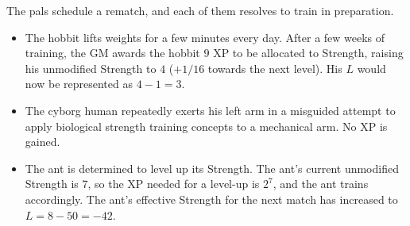 \begin{example}
The pals schedule a rematch, and each of them resolves to train in preparation.
\begin{itemize}
\item
The hobbit lifts weights for a few minutes every day.
After a few weeks of training,
the GM awards the hobbit $9$ XP to be allocated to Strength, raising his unmodified Strength to $4$ ($+1/16$ towards the next level).
His $L$ would now be represented as $4-1=3$.
\item
The cyborg human repeatedly exerts his left arm in a misguided attempt to apply biological strength training concepts to a mechanical arm.
No XP is gained.
\item
The ant is determined to level up its Strength.
The ant’s current unmodified Strength is $7$, so the XP needed for a level-up is $2^7$, and the ant trains accordingly.
The ant’s effective Strength for the next match has increased to $L=8-50=-42$.
\end{itemize}
\end{example}

